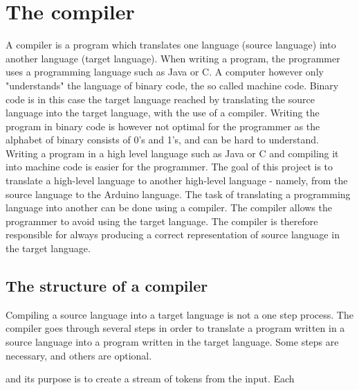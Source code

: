 \chapter{The compiler} \label{chap:the_compiler}
A compiler is a program which translates one language (source language) into another language (target language). When writing a program, the programmer uses a programming language such as Java or C. A computer however only "understands" the language of binary code, the so called machine code. Binary code is in this case the target language reached by translating the source language into the target language, with the use of a compiler. Writing the program in binary code is however not optimal for the programmer as the alphabet of binary consists of 0's and 1's, and can be hard to understand. Writing a program in a high level language such as Java or C and compiling it into machine code is easier for the programmer.
The goal of this project is to translate a high-level language to another high-level language - namely, from the source language to the Arduino language. The task of translating a programming language into another can be done using a compiler. The compiler allows the programmer to avoid using the target language. The compiler is therefore responsible for always producing a correct representation of source language in the target language.

\section{The structure of a compiler} 
\label{sec:compiler}
Compiling a source language into a target language is not a one step process. The compiler goes through several steps in order to translate a program written in a source language into a program written in the target language. Some steps are necessary, and others are optional.


and its purpose is to create a stream of tokens from the input. Each 


